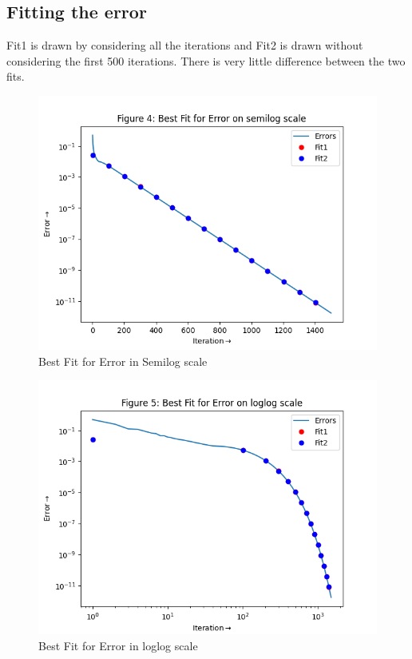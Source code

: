 \documentclass{article}
\begin{document}
\subsection{Fitting the error}
Fit1 is drawn by considering all the iterations and Fit2 is drawn without considering the first 500 iterations. There is very little difference between the two fits.


\begin{figure}[h!]
\centering
\includegraphics[scale=0.6]{4}
\caption{Best Fit for Error in Semilog scale}
\label{fig:Best Fit of error}
\end{figure}
\begin{figure}[h!]
\centering
\includegraphics[scale=0.55]{5}
\caption{Best Fit for Error in loglog scale}
\label{fig:Best Fit of error}
\end{figure}
\end{document}
